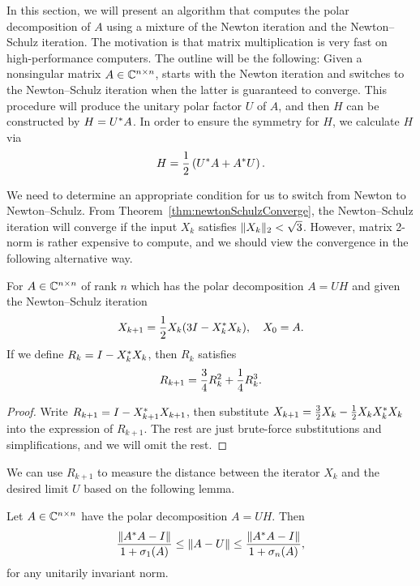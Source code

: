 \documentclass[12pt]{article}
\begin{document}
In this section, we will present an algorithm that computes the polar decomposition of $A$ using a mixture of the Newton iteration and the Newton--Schulz iteration. The motivation is that matrix multiplication is very fast on high-performance computers. The outline will be the following: Given a nonsingular matrix $A\in\mathbb{C}^{n\times n}$, starts with the Newton iteration and switches to the Newton--Schulz iteration when the latter is guaranteed to converge. This procedure will produce the unitary polar factor $U$ of $A$, and then $H$ can be constructed by $H = U^* A$. In order to ensure the symmetry for $H$, we calculate $H$ via
\begin{equation}
    \notag 
    H = \frac{1}{2}\left(U^* A + A^* U\right).
\end{equation}

We need to determine an appropriate condition for us to switch from Newton to Newton--Schulz. From Theorem~\ref{thm:newtonSchulzConverge}, the Newton--Schulz iteration will converge if the input $X_k$ satisfies $\|{X_k}\|_2 < \sqrt{3}$. However, matrix 2-norm is rather expensive to compute, and we should view the convergence in the following alternative way.

\begin{theorem}
    \label{thm:Conv-in-R}
    For $A\in\mathbb{C}^{n\times n}$ of rank $n$ which has the polar decomposition $A=UH$ and given the Newton--Schulz iteration 
    \begin{equation}
        \notag 
        X_{k+1} = \frac{1}{2}X_k(3I - X_k^* X_k), \quad X_0 = A.
    \end{equation}
    If we define $R_k = I - X_k^* X_k$, then $R_k$ satisfies
    \begin{equation}
        \notag
        R_{k+1} = \frac{3}{4}R_k^2 + \frac{1}{4}R_k^3.
    \end{equation}
\end{theorem}

\begin{proof}
    Write $R_{k+1} = I - X_{k+1}^* X_{k+1}$, then substitute $X_{k+1} = \frac{3}{2} X_k - \frac{1}{2}X_kX_k^* X_k$ into the expression of $R_{k+1}$. The rest are just brute-force substitutions and simplifications, and we will omit the rest.
\end{proof}

We can use $R_{k+1}$ to measure the distance between the iterator $X_k$ and the desired limit $U$ based on the following lemma.

\begin{lemma}
    Let $A\in\mathbb{C}^{n\times n}$ have the polar decomposition $A=UH$. Then 
    \begin{equation}
        \label{eq:DistEquiv} 
        \frac{\|{A^* A - I}\|}{1+\sigma_1(A)} \leq \|{A-U}\| \leq 
        \frac{\|{A^* A - I}\|}{1+\sigma_n(A)},
    \end{equation}
    for any unitarily invariant norm.
\end{lemma}
\end{document}
